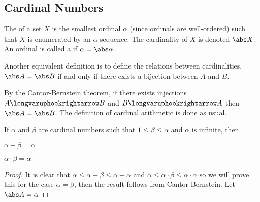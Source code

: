 \documentclass[10pt]{article}
\let\injection=\longvaruphookrightarrow
\begin{document}
\subsection{Cardinal Numbers}

\begin{defn*}

    The  of a set $X$ is the smallest ordinal $\alpha$ (since ordinals are well-ordered) such that $X$ is enumerated by an $\alpha$-sequence.
    The cardinality of $X$ is denoted $\abs X$.
    An ordinal is called a  if $\alpha=\abs\alpha$.

\end{defn*}

Another equivalent definition is to define the relations between cardinalities.
$\abs A=\abs B$ if and only if there exists a bijection between $A$ and $B$.

By the Cantor-Bernstein theorem, if there exists injections $A\injection B$ and $B\injection A$ then $\abs A=\abs B$.
The definition of cardinal arithmetic is done as usual.

\begin{thrm*}

    If $\alpha$ and $\beta$ are cardinal numbers such that $1\leq\beta\leq\alpha$ and $\alpha$ is infinite, then
    \benum
        \item $\alpha+\beta=\alpha$
        \item $\alpha\cdot\beta=\alpha$
    \eenum

\end{thrm*}

\begin{proof}

    It is clear that $\alpha\leq\alpha+\beta\leq\alpha+\alpha$ and $\alpha\leq\alpha\cdot\beta\leq\alpha\cdot\alpha$ so we will prove this for the case $\alpha=\beta$, then the result follows from
    Cantor-Bernstein.
    Let $\abs A=\alpha$

\end{proof}
\end{document}
